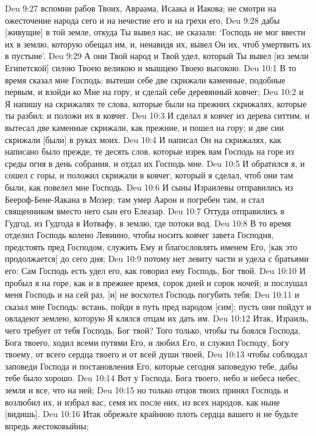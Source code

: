 Deu 9:27  вспомни рабов Твоих, Авраама, Исаака и Иакова; не смотри на ожесточение народа сего и на нечестие его и на грехи его,
Deu 9:28  дабы [живущие] в той земле, откуда Ты вывел нас, не сказали: `Господь не мог ввести их в землю, которую обещал им, и, ненавидя их, вывел Он их, чтоб умертвить их в пустыне'.
Deu 9:29  А они Твой народ и Твой удел, который Ты вывел [из земли Египетской] силою Твоею великою и мышцею Твоею высокою.
Deu 10:1  В то время сказал мне Господь: вытеши себе две скрижали каменные, подобные первым, и взойди ко Мне на гору, и сделай себе деревянный ковчег;
Deu 10:2  и Я напишу на скрижалях те слова, которые были на прежних скрижалях, которые ты разбил; и положи их в ковчег.
Deu 10:3  И сделал я ковчег из дерева ситтим, и вытесал две каменные скрижали, как прежние, и пошел на гору; и две сии скрижали [были] в руках моих.
Deu 10:4  И написал Он на скрижалях, как написано было прежде, те десять слов, которые изрек вам Господь на горе из среды огня в день собрания, и отдал их Господь мне.
Deu 10:5  И обратился я, и сошел с горы, и положил скрижали в ковчег, который я сделал, чтоб они там были, как повелел мне Господь.
Deu 10:6  И сыны Израилевы отправились из Беероф-Бене-Яакана в Мозер; там умер Аарон и погребен там, и стал священником вместо него сын его Елеазар.
Deu 10:7  Оттуда отправились в Гудгод, из Гудгода в Иотвафу, в землю, где потоки вод.
Deu 10:8  В то время отделил Господь колено Левиино, чтобы носить ковчег завета Господня, предстоять пред Господом, служить Ему и благословлять именем Его, [как это продолжается] до сего дня;
Deu 10:9  потому нет левиту части и удела с братьями его: Сам Господь есть удел его, как говорил ему Господь, Бог твой.
Deu 10:10  И пробыл я на горе, как и в прежнее время, сорок дней и сорок ночей; и послушал меня Господь и на сей раз, [и] не восхотел Господь погубить тебя;
Deu 10:11  и сказал мне Господь: встань, пойди в путь пред народом [сим]; пусть они пойдут и овладеют землею, которую Я клялся отцам их дать им.
Deu 10:12  Итак, Израиль, чего требует от тебя Господь, Бог твой? Того только, чтобы ты боялся Господа, Бога твоего, ходил всеми путями Его, и любил Его, и служил Господу, Богу твоему, от всего сердца твоего и от всей души твоей,
Deu 10:13  чтобы соблюдал заповеди Господа и постановления Его, которые сегодня заповедую тебе, дабы тебе было хорошо.
Deu 10:14  Вот у Господа, Бога твоего, небо и небеса небес, земля и все, что на ней;
Deu 10:15  но только отцов твоих принял Господь и возлюбил их, и избрал вас, семя их после них, из всех народов, как ныне [видишь].
Deu 10:16  Итак обрежьте крайнюю плоть сердца вашего и не будьте впредь жестоковыйны;
